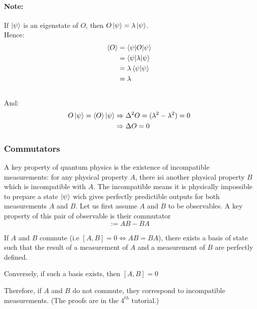\documentclass{article}
\begin{document}
\paragraph{Note:} If $\ket{\psi}$ is an eigenstate of $O$, then $O\ket{\psi} = \lambda \ket{\psi}$.
\\
Hence:
\begin{equation}
    \begin{aligned}
        \braket{O}
            & = \braket{\psi | O | \psi} \\
            & = \braket{\psi | \lambda | \psi} \\
            & = \lambda\braket{\psi|\psi } \\
            & = \lambda
    \end{aligned}
\end{equation}
\\
And:
\begin{equation}
    \begin{aligned}
        O\ket{\psi} = \braket{O} \ket{\psi}
            & \Rightarrow \Delta^2 O = (\lambda^2 - \lambda^2) = 0 \\
            & \Rightarrow \Delta O = 0
    \end{aligned}
\end{equation}

\subsubsection{Commutators}
A key property of quantum physics is the existence of incompatible measurements:
for any physical property $A$, there isi another physical property $B$ which is incompatible
with $A$. The incompatible means it is physically impossible to prepare a state $\ket{\psi}$
wich gives perfectly predictible outputs for both measurements $A$ and $B$.
Let us first assume $A$ and $B$ to be observables.
A key property of this pair of observable is their commutator
\begin{equation}
    [A,B]:= AB-BA
\end{equation}

If $A$ and $B$ commute (i.e $[A,B]=0 \Leftrightarrow AB = BA$), there exists a basis of state
such that the result of a measurement of $A$ and a measurement of $B$ are perfectly defined.

Conversely, if such a basis exists, then $[A,B]=0$

Therefore, if $A$ and $B$ do not commute, they correspond to incompatible measurements.
(The proofs are in the $4^{th}$ tutorial.)
\end{document}

